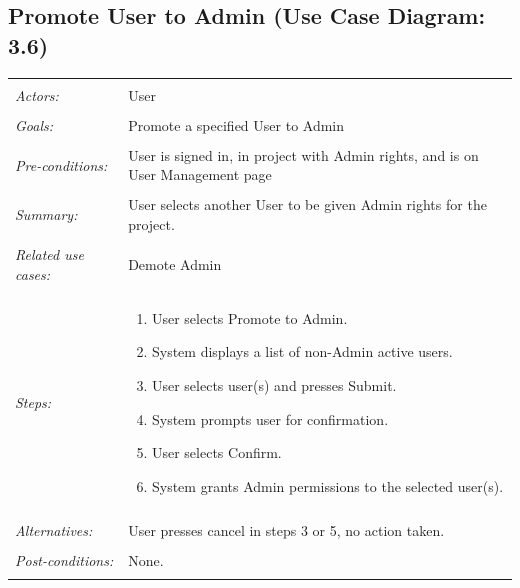 \documentclass[11pt]{report}
\begin{document}
\subsection{Promote User to Admin (Use Case Diagram: 3.6)}
\begin{tabular}{ p{2cm} p{12cm} }
    \hline
    \\
    \textit{Actors:} & User \\ 
    \\
    \textit{Goals:} & Promote a specified User to Admin \\
    \\
    \textit{Pre-conditions:} & User is signed in, in project with Admin rights, and is on User Management page \\
    \\
    \textit{Summary:} & User selects another User to be given Admin rights for the project. \\ 
    \\
    \textit{Related use cases:} & Demote Admin \\ 
    \\
    \textit{Steps:} & \begin{enumerate}
        \item User selects Promote to Admin.
        \item System displays a list of non-Admin active users.
        \item User selects user(s) and presses Submit.
        \item System prompts user for confirmation.
        \item User selects Confirm.
        \item System grants Admin permissions to the selected user(s).
    \end{enumerate} \\
    \\
    \textit{Alternatives:} & User presses cancel in steps 3 or 5, no action taken. \\
    \\
    \textit{Post-conditions:} & None. \\
    \\
    \hline
\end{tabular}
\end{document}

